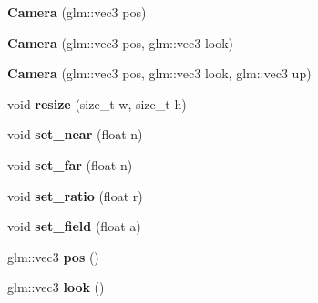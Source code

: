 \begin{DoxyCompactItemize}
\item 
\hypertarget{classs9_1_1Camera_a2d8c44f33f085961ebf67f858494a02a}{{\bfseries Camera} (glm\-::vec3 pos)}\label{classs9_1_1Camera_a2d8c44f33f085961ebf67f858494a02a}

\item 
\hypertarget{classs9_1_1Camera_ad49c6456cb88f31154c0ae4f38e95c52}{{\bfseries Camera} (glm\-::vec3 pos, glm\-::vec3 look)}\label{classs9_1_1Camera_ad49c6456cb88f31154c0ae4f38e95c52}

\item 
\hypertarget{classs9_1_1Camera_a74a959e81d720e7e0840088eab808915}{{\bfseries Camera} (glm\-::vec3 pos, glm\-::vec3 look, glm\-::vec3 up)}\label{classs9_1_1Camera_a74a959e81d720e7e0840088eab808915}

\item 
\hypertarget{classs9_1_1Camera_a6eff9242a0e38236d26c0b5b8934c23e}{void {\bfseries resize} (size\-\_\-t w, size\-\_\-t h)}\label{classs9_1_1Camera_a6eff9242a0e38236d26c0b5b8934c23e}

\item 
\hypertarget{classs9_1_1Camera_a187249f6840355e90385d77c07139541}{void {\bfseries set\-\_\-near} (float n)}\label{classs9_1_1Camera_a187249f6840355e90385d77c07139541}

\item 
\hypertarget{classs9_1_1Camera_a495b9d2c12ab823c3f0d5fc60ccd9037}{void {\bfseries set\-\_\-far} (float n)}\label{classs9_1_1Camera_a495b9d2c12ab823c3f0d5fc60ccd9037}

\item 
\hypertarget{classs9_1_1Camera_a1bb91a852163fe9ddf31468abcf0813e}{void {\bfseries set\-\_\-ratio} (float r)}\label{classs9_1_1Camera_a1bb91a852163fe9ddf31468abcf0813e}

\item 
\hypertarget{classs9_1_1Camera_a738b170a72c097cc5c834335f06dd641}{void {\bfseries set\-\_\-field} (float a)}\label{classs9_1_1Camera_a738b170a72c097cc5c834335f06dd641}

\item 
\hypertarget{classs9_1_1Camera_a03479cc99295b235cbab0c019e68660d}{glm\-::vec3 {\bfseries pos} ()}\label{classs9_1_1Camera_a03479cc99295b235cbab0c019e68660d}

\item 
\hypertarget{classs9_1_1Camera_a8a0711b866e4278587c0d2e65c0f510e}{glm\-::vec3 {\bfseries look} ()}\label{classs9_1_1Camera_a8a0711b866e4278587c0d2e65c0f510e}


\end{DoxyCompactItemize}
